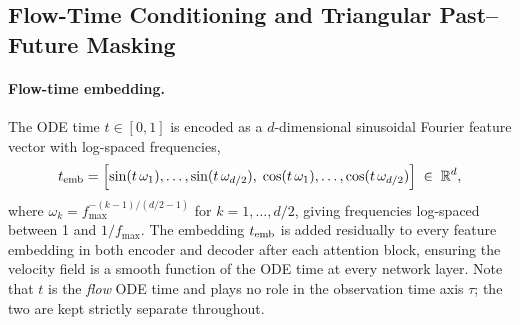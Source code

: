 \subsection{Flow-Time Conditioning and Triangular Past--Future Masking}
\label{app:flow_time}

\paragraph{Flow-time embedding.}
The ODE time $t \in [0,1]$ is encoded as a $d$-dimensional sinusoidal Fourier
feature vector with log-spaced frequencies,
\begin{equation}
    t_{\rm emb}
    = \Bigl[
        \sin(t\,\omega_1),\ldots,\sin(t\,\omega_{d/2}),\;
        \cos(t\,\omega_1),\ldots,\cos(t\,\omega_{d/2})
    \Bigr]
    \;\in\; \mathbb{R}^d,
    \label{eq:time_emb}
\end{equation}
where $\omega_k = f_{\max}^{-(k-1)/(d/2-1)}$ for $k = 1,\ldots, d/2$,
giving frequencies log-spaced between 1 and $1/f_{\max}$.
The embedding $t_{\rm emb}$ is added residually to every feature embedding in both encoder
and decoder after each attention block, ensuring the velocity field is a
smooth function of the ODE time at every network layer.
Note that $t$ is the \emph{flow} ODE time and plays no role in the observation
time axis $\tau$; the two are kept strictly separate throughout.

